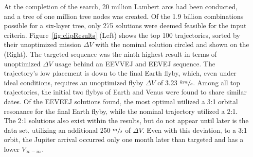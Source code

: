 \documentclass[letterpaper, preprint, paper,11pt]{AAS}	%
\begin{document}
At the completion of the search, 20 million Lambert arcs had been conducted, and a tree of one million tree nodes was created. Of the 1.9 billion combinations possible for a six-layer tree, only 275 solutions were deemed feasible for the input criteria. Figure~\ref*{fig:clipResults} (Left) shows the top 100 trajectories, sorted by their unoptimized mission $\Delta V$ with the nominal solution circled and shown on the (Right). The targeted sequence was the ninth highest result in terms of unoptimized $\Delta V$ usage behind an EEVVEJ and EEVEJ sequence. The trajectory's low placement is down to the final Earth flyby, which, even under ideal conditions, requires an unoptimized flyby $\Delta V$ of 3.23 $\sfrac{km}{s}$. Among all top trajectories, the initial two flybys of Earth and Venus were found to share similar dates. Of the EEVEEJ solutions found, the most optimal utilized a 3:1 orbital resonance for the final Earth flyby, while the nominal trajectory utilized a 2:1. The 2:1 solutions also exist within the results, but do not appear until later is the data set, utilizing an additional 250 $\sfrac{m}{s}$ of $\Delta V$. Even with this deviation, to a 3:1 orbit, the Jupiter arrival occurred only one month later than targeted and has a lower $V_{\infty-in}$.
\end{document}
